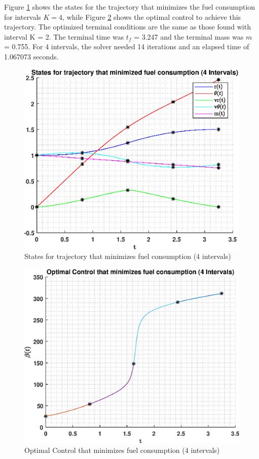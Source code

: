 \documentclass[]{article}
\begin{document}
Figure \ref{fig:indirectMultiStates4} shows the states for the trajectory that minimizes the fuel consumption for intervals \(K = 4\), while Figure \ref{fig:indirectMultiControl4} shows the optimal control to achieve this trajectory. The optimized terminal conditions are the same as those found with interval K = 2. The terminal time was \(t_f\) = 3.247 and the terminal mass was \(m\) = 0.755. For 4 intervals, the solver needed 14 iterations and an elapsed time of 1.067073 seconds.
\begin{figure}
	\centering
	\includegraphics[scale=0.75]{indirectMultiStates4.eps}
	\caption{States for trajectory that minimizes fuel consumption (4 intervals)}
	\label{fig:indirectMultiStates4}
\end{figure}
\begin{figure}
	\centering
	\includegraphics[scale=0.75]{indirectMultiControl4.eps}
	\caption{Optimal Control that minimizes fuel consumption (4 intervals)}
	\label{fig:indirectMultiControl4}
\end{figure}
\FloatBarrier
\end{document}
